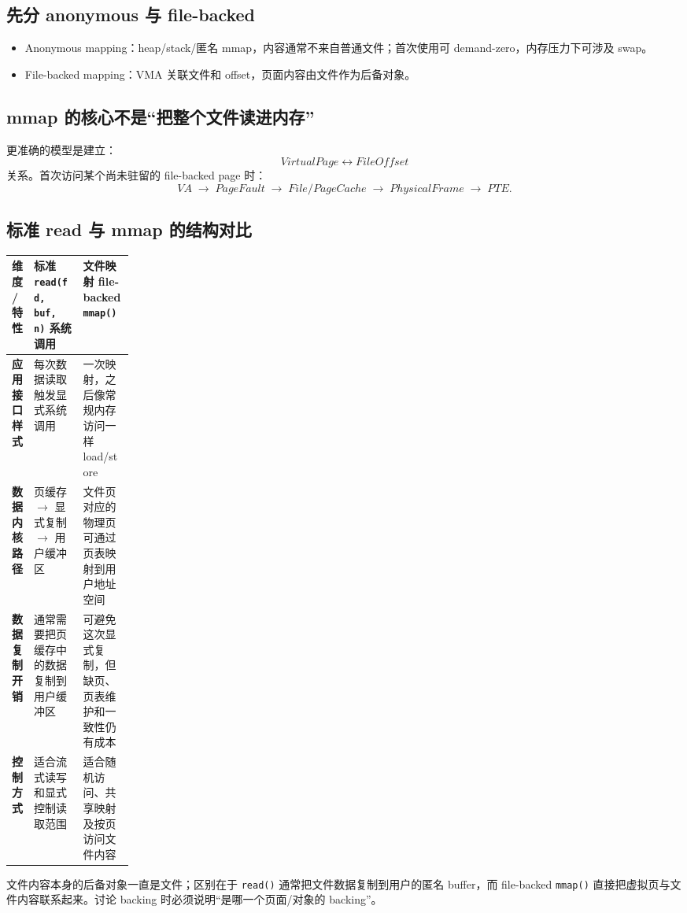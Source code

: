 \documentclass[11pt,a4paper]{ctexart}
\newcommand{\code}[1]{\texttt{#1}}
\newcommand{\arr}{\;\longrightarrow\;}
\begin{document}
\subsection{先分 anonymous 与 file-backed}
\begin{itemize}
  \item Anonymous mapping：heap/stack/匿名 mmap，内容通常不来自普通文件；首次使用可 demand-zero，内存压力下可涉及 swap。
  \item File-backed mapping：VMA 关联文件和 offset，页面内容由文件作为后备对象。
\end{itemize}

\subsection{mmap 的核心不是“把整个文件读进内存”}
更准确的模型是建立：
\[
\boxed{VirtualPage \leftrightarrow FileOffset}
\]
关系。首次访问某个尚未驻留的 file-backed page 时：
\[
VA\arr PageFault\arr File/PageCache\arr PhysicalFrame\arr PTE.
\]

\subsection{标准 read 与 mmap 的结构对比}
\begingroup
\small
\renewcommand{\arraystretch}{1.25}
\setlength{\tabcolsep}{6pt}
\begin{tabularx}{\linewidth}{>{\bfseries}p{0.18\linewidth} X X}
\toprule
维度 / 特性 & 标准 \code{read(fd, buf, n)} 系统调用 & 文件映射 file-backed \code{mmap()}\\
\midrule
应用接口样式 & 每次数据读取触发显式系统调用 & 一次映射，之后像常规内存访问一样 load/store\\
数据内核路径 & 页缓存 $\rightarrow$ 显式复制 $\rightarrow$ 用户缓冲区 & 文件页对应的物理页可通过页表映射到用户地址空间\\
数据复制开销 & 通常需要把页缓存中的数据复制到用户缓冲区 & 可避免这次显式复制，但缺页、页表维护和一致性仍有成本\\
控制方式 & 适合流式读写和显式控制读取范围 & 适合随机访问、共享映射及按页访问文件内容\\
\bottomrule
\end{tabularx}
\endgroup

\begin{warn}
文件内容本身的后备对象一直是文件；区别在于 \code{read()} 通常把文件数据复制到用户的匿名 buffer，而 file-backed \code{mmap()} 直接把虚拟页与文件内容联系起来。讨论 backing 时必须说明“是哪一个页面/对象的 backing”。
\end{warn}
\end{document}
